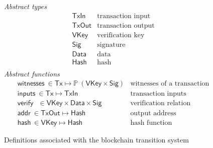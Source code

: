\documentclass[11pt,a4paper]{article}
\newcommand{\powerset}[1]{\mathbb{P}~#1}
\newcommand{\var}[1]{\mathit{#1}}
\newcommand{\fun}[1]{\mathsf{#1}}
\newcommand{\type}[1]{\mathsf{#1}}
\newcommand{\Tx}{\type{Tx}}
\newcommand{\TxIn}{\type{TxIn}}
\newcommand{\TxOut}{\type{TxOut}}
\newcommand{\VKey}{\type{VKey}}
\newcommand{\Sig}{\type{Sig}}
\newcommand{\Data}{\type{Data}}
\newcommand{\Hash}{\type{Hash}}
\newcommand{\inputs}[1]{\fun{inputs}\ \var{#1}}
\newcommand{\witnesses}[1]{\fun{witnesses}\ \var{#1}}
\newcommand{\verify}[3]{\fun{verify} ~ #1 ~ #2 ~ #3}
\newcommand{\addr}[1]{\fun{addr}\ \var{#1}}
\newcommand{\hash}[1]{\fun{hash}\ \var{#1}}
\begin{document}
\begin{figure}[h]
  \emph{Abstract types}
  \begin{align*}
    & \TxIn & \text{transaction input}\\
    & \TxOut & \text{transaction output}\\
    & \VKey & \text{verification key}\\
    & \Sig  & \text{signature}\\
    & \Data  & \text{data}\\
    & \Hash  & \text{hash}\\
  \end{align*}
  \emph{Abstract functions}
  \begin{align*}
    & \witnesses{} \in \Tx \mapsto \powerset{(\VKey \times \Sig)}
    & \text{witnesses of a transaction}\\
    & \inputs{} \in \Tx \mapsto \TxIn
    & \text{transaction inputs}\\
    & \verify{}{}{} \in \VKey \times \Data \times \Sig
    & \text{verification relation}\\
    & \addr{} \in \TxOut \mapsto \Hash
    & \text{output address} \\
    & \hash{} \in \VKey \mapsto \Hash
    & \text{hash function}
  \end{align*}
  \caption{Definitions associated with the blockchain transition system}
  \label{fig:state-trans-abstract}
\end{figure}
\end{document}
